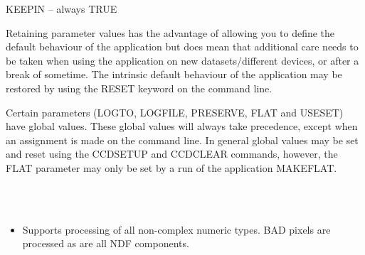\documentclass[twoside,11pt]{article}
\newcommand{\htmlref}[2]{#1}
\renewcommand{\_}{\texttt{\symbol{95}}}
\newcommand{\xroutine}[1]{\htmlref{{\sc #1}}{#1}}
\newcommand{\sstimplementationstatus}[1]{
   \item[{Implementation Status:}] \mbox{} \\[1.3ex] #1}
\newcommand{\sstitemlist}[1]{
  \mbox{} \\
  \vspace{-3.5ex}
  \begin{itemize}
     #1
  \end{itemize}
}
\newcommand{\sstitem}{\item}
\newcommand{\sstimplementationstatus}[1]{
      \item[Implementation Status:] #1
   }
\newcommand{\sstitemlist}[1]{
      \begin{itemize}
         #1
      \end{itemize}
      \\
   }
\newcommand{\sstitem}{\item}
\begin{document}
{{{         \sstitem
            KEEPIN  -- always TRUE

      }
      Retaining parameter values has the advantage of allowing you to
      define the default behaviour of the application but does mean
      that additional care needs to be taken when using the application
      on new datasets/different devices, or after a break of sometime.
      The intrinsic default behaviour of the application may be
      restored by using the RESET keyword on the command line.

      Certain parameters (LOGTO, LOGFILE, PRESERVE, FLAT and USESET) have
      global values. These global values will always take precedence,
      except when an assignment is made on the command line.  In general
      global values may be set and reset using the \xroutine{CCDSETUP} and
      \xroutine{CCDCLEAR} commands, however, the FLAT parameter may only be set by
      a run of the application \xroutine{MAKEFLAT}.
   }
   \sstimplementationstatus{
      \sstitemlist{

         \sstitem
         Supports processing of all non-complex numeric types.
           BAD pixels are processed as are all NDF components.
      }
   }
}
\end{document}

